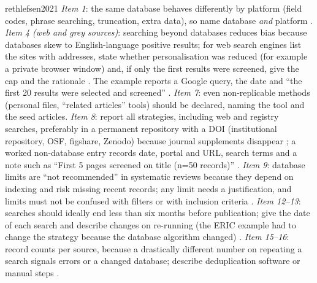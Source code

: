 \begin{papercard}{rethlefsen2021}
 \emph{Item 1}: the same database behaves differently by platform (field codes, phrase searching, truncation, extra data), so name database \emph{and} platform . \emph{Item 4 (web and grey sources)}: searching beyond databases reduces bias because databases skew to English-language positive results; for web search engines list the sites with addresses, state whether personalisation was reduced (for example a private browser window) and, if only the first results were screened, give the cap and the rationale . The example reports a Google query, the date and ``the first 20 results were selected and screened'' . \emph{Item 7}: even non-replicable methods (personal files, ``related articles'' tools) should be declared, naming the tool and the seed articles. \emph{Item 8}: report all strategies, including web and registry searches, preferably in a permanent repository with a DOI (institutional repository, OSF, figshare, Zenodo) because journal supplements disappear ; a worked non-database entry records date, portal and URL, search terms and a note such as ``First 5 pages screened on title (n=50 records)'' . \emph{Item 9}: database limits are ``not recommended'' in systematic reviews because they depend on indexing and risk missing recent records; any limit needs a justification, and limits must not be confused with filters or with inclusion criteria . \emph{Item 12--13}: searches should ideally end less than six months before publication; give the date of each search and describe changes on re-running (the ERIC example had to change the strategy because the database algorithm changed) . \emph{Item 15--16}: record counts per source, because a drastically different number on repeating a search signals errors or a changed database; describe deduplication software or manual steps .


\end{papercard}

